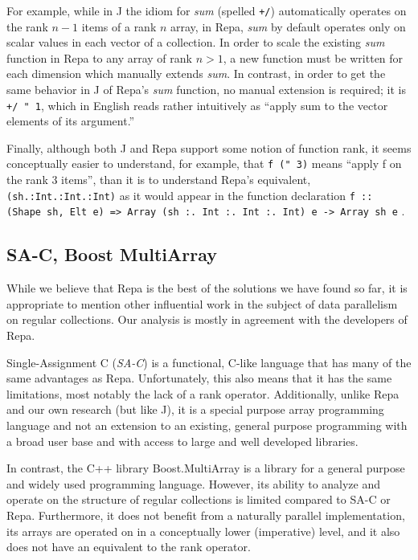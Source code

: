 For example, while in J the idiom for \textit{sum} (spelled \texttt{+/}) 
automatically operates on the rank $n-1$ items of a rank $n$ array, 
in Repa, \textit{sum} by default operates only on scalar values in each vector of a collection.
In order to scale the existing \textit{sum} function in Repa to any array of rank $n > 1$, 
a new function must be written for each dimension which manually extends \textit{sum}\cite{dph}.
In contrast, in order to get the same behavior in J of Repa's \textit{sum} function, no manual extension is required; 
it is \texttt{+/ " 1}, which in English reads rather intuitively as ``apply sum to the vector elements of its argument.''

Finally, although both J and Repa support some notion of function rank, 
it seems conceptually easier to understand, for example, 
that \texttt{f (" 3)} means ``apply f on the rank 3 items'', than it is to understand Repa's equivalent, 
\texttt{(sh.:Int.:Int.:Int)} as it would appear in the function declaration  
\texttt{f :: (Shape sh, Elt e) => Array (sh :. Int :. Int :. Int) e -> Array sh e} .

\subsection{SA-C, Boost MultiArray}
While we believe that Repa is the best of the solutions we have found so far, 
it is appropriate to mention other influential work in the subject of data parallelism on regular collections.
Our analysis is mostly in agreement with the developers of Repa.\cite{dph}

Single-Assignment C (\textit{SA-C}) is a functional, C-like language 
that has many of the same advantages as Repa\cite{dph}\cite{sac}.
Unfortunately, this also means that it has the same limitations, most notably the lack of a rank operator.
Additionally, unlike Repa and our own research (but like J), 
it is a special purpose array programming language and 
not an extension to an existing, general purpose programming with a broad user base and 
with access to large and well developed libraries.

In contrast, the C++ library Boost.MultiArray is a library for a general purpose and widely used programming language\cite{boost}.
However, its ability to analyze and operate on the structure of regular collections is limited compared to SA-C or Repa.
Furthermore, it does not benefit from a naturally parallel implementation, 
its arrays are operated on in a conceptually lower (imperative) level, 
and it also does not have an equivalent to the rank operator. 

